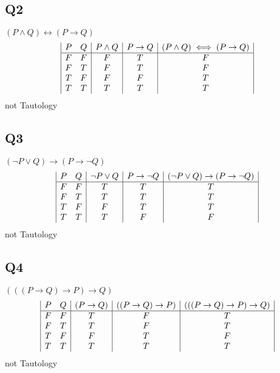 \documentclass[a4paper,12pt]{article}
\begin{document}
\subsection{Q2}
$(P \wedge Q) \leftrightarrow (P \rightarrow Q)$\\
\begin{displaymath}
\begin {array} {|c c |c|c|c|}
P & Q & P \wedge Q &P \rightarrow Q & (P \wedge Q) \iff (P \rightarrow Q)\\
\hline
F & F & F & T & F \\
F & T & F & T & F \\
T & F & F & F & T \\
T & T & T & T & T \\

\end{array}
\end{displaymath}
not Tautology\\

\subsection{Q3}
$(\lnot P \vee Q) \rightarrow (P \rightarrow \lnot Q)$\\
\begin{displaymath}
\begin {array} {|c c |c|c|c|}
P & Q & \lnot P \vee Q &P \rightarrow \lnot Q
&(\lnot P \vee Q) \rightarrow (P \rightarrow \lnot Q)\\
\hline
F & F & T & T & T \\
F & T & T & T & T \\
T & F & F & T & T \\
T & T & T & F & F \\ 
\end{array}
\end{displaymath} 
not Tautology\\
\pagebreak

\subsection{Q4}
$(((P \rightarrow Q) \rightarrow P) \rightarrow Q)$\\

\begin{displaymath}
\begin {array} {|c c |c|c|c|}
P & Q & (P \rightarrow Q) & ((P \rightarrow Q) \rightarrow P)
&(((P \rightarrow Q) \rightarrow P) \rightarrow Q)\\
\hline
F & F & T & F & T \\
F & T & T & F & T \\
T & F & F & T & F \\
T & T & T & T & T \\

\end{array}
\end{displaymath}
not Tautology
\end{document}
